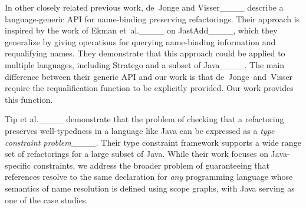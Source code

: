 
In other closely related previous work, de~Jonge and Visser____ describe a language-generic API for name-binding preserving refactorings.
Their approach is inspired by the work of Ekman et~al.____ on JastAdd____, which they generalize by giving operations for querying name-binding information and requalifying names.
They demonstrate that this approach could be applied to multiple languages, including Stratego and a subset of Java____.
The main difference between their generic API and our work is that de~Jonge~and~Visser require the requalification function to be explicitly provided.
Our work provides this function.


Tip et al.____ demonstrate that the problem of checking that a refactoring preserves well-typedness in a language like Java can be expressed as a \emph{type constraint problem}____.
Their type constraint framework supports a wide range set of refactorings for a large subset of Java.
While their work focuses on Java-specific constraints, we address the broader problem of guaranteeing that references resolve to the same declaration for \emph{any} programming language whose semantics of name resolution is defined using scope graphs, with Java serving as one of the case studies.

